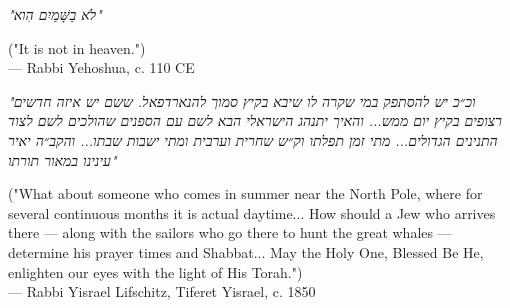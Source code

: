 \begin{flushright}
\begin{hebrew}
\emph{"לֹא בַשָּׁמַיִם הִוא"}\\
\end{hebrew}
("It is not in heaven.")\\
— Rabbi Yehoshua, c. 110 CE
\end{flushright}

\vspace{2em}

\begin{flushright}
\begin{hebrew}
\emph{"וכ״כ יש להסתפק במי שקרה לו שיבא בקיץ סמוך להנארדפאל. ששם יש איזה חדשים רצופים בקיץ יום ממש... והאיך יתנהג הישראלי הבא לשם עם הספנים שהולכים לשם לצוד התנינים הגדולים... מתי זמן תפלתו וק״ש שחרית וערבית ומתי ישבות שבתו... והקב״ה יאיר עינינו במאור תורתו"}\\
\end{hebrew}
("What about someone who comes in summer near the North Pole, where for several continuous months it is actual daytime... How should a Jew who arrives there — along with the sailors who go there to hunt the great whales — determine his prayer times and Shabbat... May the Holy One, Blessed Be He, enlighten our eyes with the light of His Torah.")\\
— Rabbi Yisrael Lifschitz, Tiferet Yisrael, c. 1850
\end{flushright}